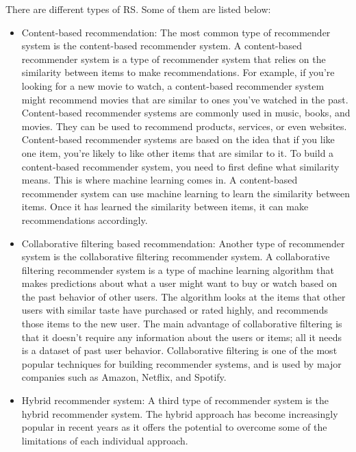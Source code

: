 \documentclass[11pt]{article}
\begin{document}
There are different types of RS. Some of them are listed below:

\begin{itemize}
\item Content-based recommendation: The most common type of recommender system is the content-based recommender system. A content-based recommender system is a type of recommender system that relies on the similarity between items to make recommendations. For example, if you’re looking for a new movie to watch, a content-based recommender system might recommend movies that are similar to ones you’ve watched in the past. Content-based recommender systems are commonly used in music, books, and movies. They can be used to recommend products, services, or even websites. Content-based recommender systems are based on the idea that if you like one item, you’re likely to like other items that are similar to it. To build a content-based recommender system, you need to first define what similarity means. This is where machine learning comes in. A content-based recommender system can use machine learning to learn the similarity between items. Once it has learned the similarity between items, it can make recommendations accordingly.

\item Collaborative filtering based recommendation: 
Another type of recommender system is the collaborative filtering recommender system. A collaborative filtering recommender system is a type of machine learning algorithm that makes predictions about what a user might want to buy or watch based on the past behavior of other users. The algorithm looks at the items that other users with similar taste have purchased or rated highly, and recommends those items to the new user.
The main advantage of collaborative filtering is that it doesn’t require any information about the users or items; all it needs is a dataset of past user behavior. Collaborative filtering is one of the most popular techniques for building recommender systems, and is used by major companies such as Amazon, Netflix, and Spotify.

\item Hybrid recommender system: A third type of recommender system is the hybrid recommender system. The hybrid approach has become increasingly popular in recent years as it offers the potential to overcome some of the limitations of each individual approach.
\end{itemize}
\end{document}
